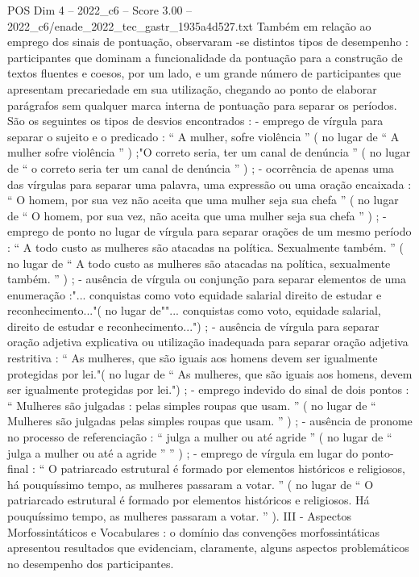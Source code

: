 \begin{textsample}{POS Dim 4 – 2022\_c6 – Score 3.00 – 2022\_c6/enade\_2022\_tec\_gastr\_1935a4d527.txt}
Também em relação ao emprego dos sinais de pontuação, observaram -se distintos tipos de desempenho : participantes que dominam a funcionalidade da pontuação para a construção de textos fluentes e coesos, por um lado, e um grande número de participantes que apresentam precariedade em sua utilização, chegando ao ponto de elaborar parágrafos sem qualquer marca interna de pontuação para separar os períodos.
São os seguintes os tipos de desvios encontrados : - emprego de vírgula para separar o sujeito e o predicado : “ A mulher, sofre violência ” ( no lugar de “ A mulher sofre violência ” ) ;"O correto seria, ter um canal de denúncia ” ( no lugar de “ o correto seria ter um canal de denúncia ” ) ; - ocorrência de apenas uma das vírgulas para separar uma palavra, uma expressão ou uma oração encaixada : “ O homem, por sua vez não aceita que uma mulher seja sua chefa ” ( no lugar de “ O homem, por sua vez, não aceita que uma mulher seja sua chefa ” ) ; - emprego de ponto no lugar de vírgula para separar orações de um mesmo período : “ A todo custo as mulheres são atacadas na política.
Sexualmente também. ” ( no lugar de “ A todo custo as mulheres são atacadas na política, sexualmente também. ” ) ; - ausência de vírgula ou conjunção para separar elementos de uma enumeração :"... conquistas como voto equidade salarial direito de estudar e reconhecimento..."( no lugar de""... conquistas como voto, equidade salarial, direito de estudar e reconhecimento...") ; - ausência de vírgula para separar oração adjetiva explicativa ou utilização inadequada para separar oração adjetiva restritiva : “ As mulheres, que são iguais aos homens devem ser igualmente protegidas por lei."( no lugar de “ As mulheres, que são iguais aos homens, devem ser igualmente protegidas por lei.") ; - emprego indevido do sinal de dois pontos : “ Mulheres são julgadas : pelas simples roupas que usam. ” ( no lugar de “ Mulheres são julgadas pelas simples roupas que usam. ” ) ; - ausência de pronome no processo de referenciação : “ julga a mulher ou até agride ” ( no lugar de “ julga a mulher ou até a agride ” ” ) ; - emprego de vírgula em lugar do ponto-final : “ O patriarcado estrutural é formado por elementos históricos e religiosos, há pouquíssimo tempo, as mulheres passaram a votar. ” ( no lugar de “ O patriarcado estrutural é formado por elementos históricos e religiosos.
Há pouquíssimo tempo, as mulheres passaram a votar. ” ).
III - Aspectos Morfossintáticos e Vocabulares : o domínio das convenções morfossintáticas apresentou resultados que evidenciam, claramente, alguns aspectos problemáticos no desempenho dos participantes.

\end{textsample}

